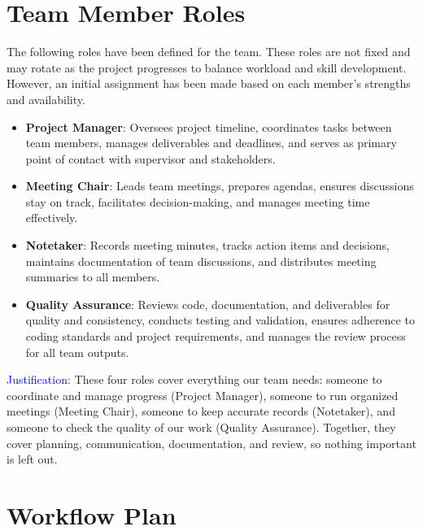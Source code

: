 \documentclass{article}
\begin{document}
\section{Team Member Roles}


The following roles have been defined for the team. These roles are not fixed and may
rotate as the project progresses to balance workload and skill development.
However, an initial assignment has been made based on each member’s strengths and
availability.

\begin{itemize}
  \item \textbf{Project Manager}: Oversees project timeline, coordinates tasks between team members, manages deliverables and deadlines, and serves as primary point of contact with supervisor and stakeholders.
  \item \textbf{Meeting Chair}: Leads team meetings, prepares agendas, ensures discussions stay on track, facilitates decision-making, and manages meeting time effectively.
  \item \textbf{Notetaker}: Records meeting minutes, tracks action items and decisions, maintains documentation of team discussions, and distributes meeting summaries to all members.
  \item \textbf{Quality Assurance}: Reviews code, documentation, and deliverables for quality and consistency, conducts testing and validation, ensures adherence to coding standards and project requirements, and manages the review process for all team outputs.
\end{itemize}

\textcolor{blue}{Justification:} These four roles cover everything our team needs:
someone to coordinate and manage progress (Project Manager), someone to run
organized meetings (Meeting Chair), someone to keep accurate records (Notetaker),
and someone to check the quality of our work (Quality Assurance). Together,
they cover planning, communication, documentation, and review, so nothing
important is left out.

\section{Workflow Plan}
\end{document}
